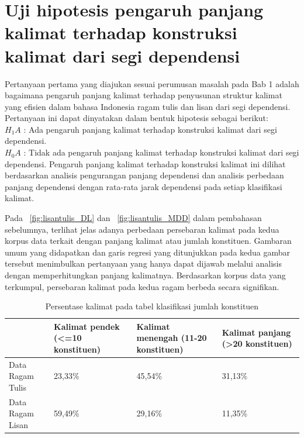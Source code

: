 \section{Uji hipotesis pengaruh panjang kalimat terhadap konstruksi kalimat dari segi dependensi}
Pertanyaan pertama yang diajukan sesuai perumusan masalah pada Bab 1 adalah bagaimana pengaruh panjang kalimat terhadap penyusunan struktur kalimat yang efisien dalam bahasa Indonesia ragam tulis dan lisan dari segi dependensi. Pertanyaan ini dapat dinyatakan dalam bentuk hipotesis sebagai berikut: \\
$H_{1}A$ : Ada pengaruh panjang kalimat terhadap konstruksi kalimat dari segi dependensi. \\
$H_{0}A$ : Tidak ada pengaruh panjang kalimat terhadap konstruksi kalimat dari segi dependensi.
Pengaruh panjang kalimat terhadap konstruksi kalimat ini dilihat berdasarkan analisis pengurangan panjang dependensi dan analisis perbedaan panjang dependensi dengan rata-rata jarak dependensi pada setiap klasifikasi kalimat.  

Pada \pic~\ref{fig:lisantulis_DL}  dan \pic~\ref{fig:lisantulis_MDD} dalam pembahasan sebelumnya, terlihat jelas adanya perbedaan persebaran kalimat pada kedua korpus data terkait dengan panjang kalimat atau jumlah konstituen. Gambaran umum yang didapatkan dan garis regresi yang ditunjukkan pada kedua gambar tersebut menimbulkan pertanyaan yang hanya dapat dijawab melalui analisis dengan memperhitungkan panjang kalimatnya. Berdasarkan korpus data yang terkumpul, persebaran kalimat pada kedua ragam berbeda secara signifikan. 

\begin{table}
\begin{center}
\begin{small}
   \caption{Persentase kalimat pada tabel klasifikasi jumlah konstituen}  \label{tab:presentase_kalimat}
  \begin{tabular}{ |p{3cm} | p{3cm} | p{3cm} | p{3cm} |}
    \hline
 & Kalimat pendek \newline (\textless=10 konstituen) & Kalimat menengah (11-20 konstituen) & Kalimat panjang (\textgreater20 konstituen) \\ \hline
Data Ragam Tulis & 23,33\% & 45,54\% & 31,13\% \\ \hline
Data Ragam Lisan & 59,49\% & 29,16\% & 11,35\% \\ \hline
  \end{tabular}
  \end{small}
\end{center}
\end{table}

